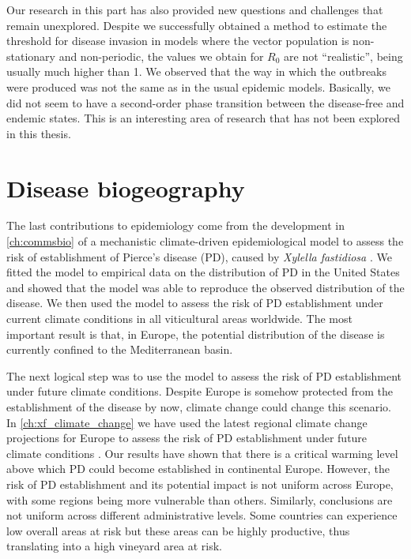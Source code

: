 Our research in this part has also provided new questions and challenges that
remain unexplored. Despite we successfully obtained a method to estimate the
threshold for disease invasion in models where the vector population is
non-stationary and non-periodic, the values we obtain for $R_0$ are not
``realistic'', being usually much higher than 1. We observed that the way in
which the outbreaks were produced was not the same as in the usual epidemic
models. Basically, we did not seem to have a second-order phase transition
between the disease-free and endemic states. This is an interesting area of
research that has not been explored in this thesis.

\section{Disease biogeography}

The last contributions to epidemiology come from the development in
\cref{ch:commsbio} of a mechanistic climate-driven epidemiological model to
assess the risk of establishment of Pierce's disease (PD), caused by
\textit{Xylella fastidiosa} \cite{GimenezRomero2022_CommsBio}. We fitted the
model to empirical data on the distribution of PD in the United States and
showed that the model was able to reproduce the observed distribution of the
disease. We then used the model to assess the risk of PD establishment under
current climate conditions in all viticultural areas worldwide. The most
important result is that, in Europe, the potential distribution of the disease
is currently confined to the Mediterranean basin.

The next logical step was to use the model to assess the risk of PD
establishment under future climate conditions. Despite Europe is somehow
protected from the establishment of the disease by now, climate change could
change this scenario. In \cref{ch:xf_climate_change} we have used the latest
regional climate change projections for Europe to assess the risk of PD
establishment under future climate conditions \cite{GimenezRomero2023_PD}.
Our results have shown that there is a critical warming level above which PD
could become established in continental Europe. However, the risk of PD
establishment and its potential impact is not uniform across Europe, with some
regions being more vulnerable than others. Similarly, conclusions are not
uniform across different administrative levels. Some countries can experience
low overall areas at risk but these areas can be highly productive, thus
translating into a high vineyard area at risk.

